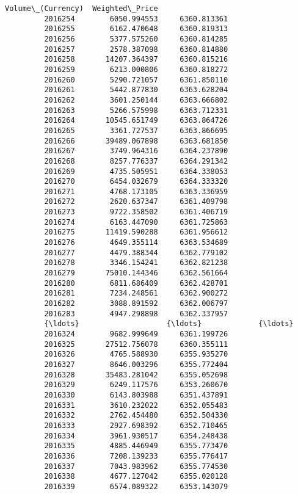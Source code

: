 \documentclass[11pt]{article}
\begin{document}
\begin{Verbatim}[commandchars=\\\{\}]
                  Volume\_(Currency)  Weighted\_Price  
         2016254        6050.994553     6360.813361  
         2016255        6162.470648     6360.819313  
         2016256        5377.575260     6360.814285  
         2016257        2578.387098     6360.814880  
         2016258       14207.364397     6360.815216  
         2016259        6213.000806     6360.818272  
         2016260        5290.721057     6361.850110  
         2016261        5442.877830     6363.628204  
         2016262        3601.250144     6363.666802  
         2016263        5266.575998     6363.712331  
         2016264       10545.651749     6363.864726  
         2016265        3361.727537     6363.866695  
         2016266       39489.067898     6363.681850  
         2016267        3749.964316     6364.237890  
         2016268        8257.776337     6364.291342  
         2016269        4735.505951     6364.338053  
         2016270        6454.032679     6364.333320  
         2016271        4768.173105     6363.336959  
         2016272        2620.637347     6361.409798  
         2016273        9722.358502     6361.406719  
         2016274        6163.447090     6361.725863  
         2016275       11419.590288     6361.956612  
         2016276        4649.355114     6363.534689  
         2016277        4479.388344     6362.779102  
         2016278        3346.154241     6362.821238  
         2016279       75010.144346     6362.561664  
         2016280        6811.686409     6362.428701  
         2016281        7234.248561     6362.900272  
         2016282        3088.891592     6362.006797  
         2016283        4947.298898     6362.337957  
         {\ldots}                    {\ldots}             {\ldots}  
         2016324        9682.999649     6361.199726  
         2016325       27512.756078     6360.355111  
         2016326        4765.588930     6355.935270  
         2016327        8646.003296     6355.772404  
         2016328       35483.281042     6355.052698  
         2016329        6249.117576     6353.260670  
         2016330        6143.803988     6351.437891  
         2016331        3610.232022     6352.055483  
         2016332        2762.454480     6352.504330  
         2016333        2927.698392     6352.710465  
         2016334        3961.930517     6354.248438  
         2016335        4885.446949     6355.773470  
         2016336        7208.139233     6355.776417  
         2016337        7043.983962     6355.774530  
         2016338        4677.127042     6355.020128  
         2016339        6574.089322     6353.143079  

\end{Verbatim}
\end{document}
